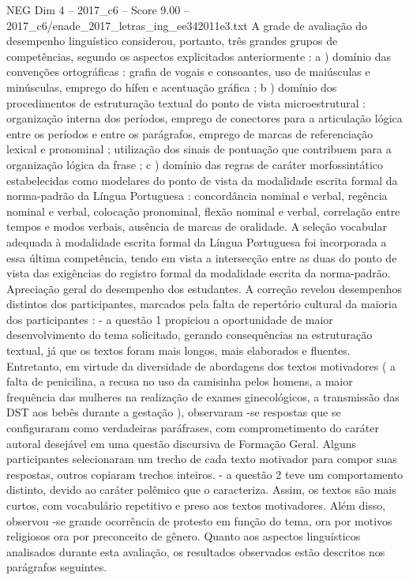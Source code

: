 \begin{textsample}{NEG Dim 4 – 2017\_c6 – Score 9.00 – 2017\_c6/enade\_2017\_letras\_ing\_ee342011e3.txt}
A grade de avaliação do desempenho linguístico considerou, portanto, três grandes grupos de competências, segundo os aspectos explicitados anteriormente : a ) domínio das convenções ortográficas : grafia de vogais e consoantes, uso de maiúsculas e minúsculas, emprego do hífen e acentuação gráfica ; b ) domínio dos procedimentos de estruturação textual do ponto de vista microestrutural : organização interna dos períodos, emprego de conectores para a articulação lógica entre os períodos e entre os parágrafos, emprego de marcas de referenciação lexical e pronominal ; utilização dos sinais de pontuação que contribuem para a organização lógica da frase ; c ) domínio das regras de caráter morfossintático estabelecidas como modelares do ponto de vista da modalidade escrita formal da norma-padrão da Língua Portuguesa : concordância nominal e verbal, regência nominal e verbal, colocação pronominal, flexão nominal e verbal, correlação entre tempos e modos verbais, ausência de marcas de oralidade.
A seleção vocabular adequada à modalidade escrita formal da Língua Portuguesa foi incorporada a essa última competência, tendo em vista a intersecção entre as duas do ponto de vista das exigências do registro formal da modalidade escrita da norma-padrão.
Apreciação geral do desempenho dos estudantes.
A correção revelou desempenhos distintos dos participantes, marcados pela falta de repertório cultural da maioria dos participantes : - a questão 1 propiciou a oportunidade de maior desenvolvimento do tema solicitado, gerando consequências na estruturação textual, já que os textos foram mais longos, mais elaborados e fluentes.
Entretanto, em virtude da diversidade de abordagens dos textos motivadores ( a falta de penicilina, a recusa no uso da camisinha pelos homens, a maior frequência das mulheres na realização de exames ginecológicos, a transmissão das DST aos bebês durante a gestação ), observaram -se respostas que se configuraram como verdadeiras paráfrases, com comprometimento do caráter autoral desejável em uma questão discursiva de Formação Geral.
Alguns participantes selecionaram um trecho de cada texto motivador para compor suas respostas, outros copiaram trechos inteiros. - a questão 2 teve um comportamento distinto, devido ao caráter polêmico que o caracteriza.
Assim, os textos são mais curtos, com vocabulário repetitivo e preso aos textos motivadores.
Além disso, observou -se grande ocorrência de protesto em função do tema, ora por motivos religiosos ora por preconceito de gênero.
Quanto aos aspectos linguísticos analisados durante esta avaliação, os resultados observados estão descritos nos parágrafos seguintes.

\end{textsample}
